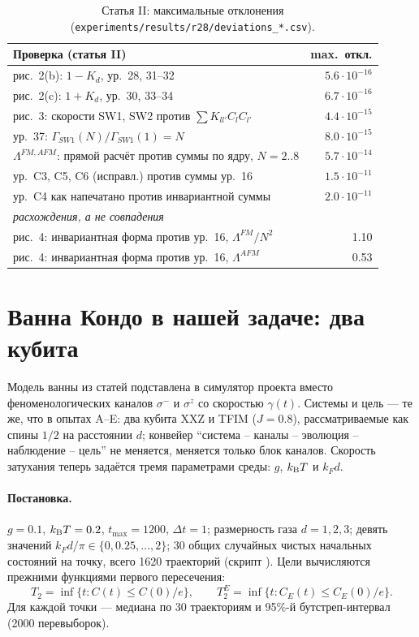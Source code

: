 \begin{table}[htbp]\centering\small
\begin{tabular}{lr}
\toprule
Проверка (статья II) & max.\ откл. \\
\midrule
рис.~2(b): $1-K_d$, ур.~28, 31--32 & $5.6\cdot 10^{-16}$ \\
рис.~2(c): $1+K_d$, ур.~30, 33--34 & $6.7\cdot 10^{-16}$ \\
рис.~3: скорости SW1, SW2 против $\sum K_{ll'}C_lC_{l'}$ & $4.4\cdot 10^{-15}$ \\
ур.~37: $\Gamma_{SW1}(N)/\Gamma_{SW1}(1)=N$ & $8.0\cdot 10^{-15}$ \\
$\Lambda^{FM,AFM}$: прямой расчёт против суммы по ядру, $N=2..8$ & $5.7\cdot 10^{-14}$ \\
ур.~C3, C5, C6 (исправл.) против суммы ур.~16 & $1.5\cdot 10^{-11}$ \\
ур.~C4 как напечатано против инвариантной суммы & $2.0\cdot 10^{-11}$ \\
\midrule
\multicolumn{2}{l}{\emph{расхождения, а не совпадения}} \\
рис.~4: инвариантная форма против ур.~16, $\Lambda^{FM}/N^2$ & 1.10 \\
рис.~4: инвариантная форма против ур.~16, $\Lambda^{AFM}$ & 0.53 \\
\bottomrule
\end{tabular}
\caption{Статья II: максимальные отклонения
(\texttt{experiments/results/r28/deviations\_*.csv}).}
\label{tab:kondo_prb}\end{table}

\section{Ванна Кондо в нашей задаче: два кубита}
\label{sec:kondo_demo}
Модель ванны из статей подставлена в симулятор проекта вместо
феноменологических каналов $\sigma^-$ и $\sigma^z$ со скоростью $\gamma(t)$. Системы
и цель --- те же, что в опытах A--E: два кубита XXZ и TFIM ($J=0.8$),
рассматриваемые как спины $1/2$ на расстоянии $d$; конвейер ``система --
каналы -- эволюция -- наблюдение -- цель'' не меняется, меняется только блок
каналов. Скорость затухания теперь задаётся тремя параметрами среды: $g$,
$k_{\mathrm B}T$ и $k_Fd$.

\paragraph{Постановка.} $g=0.1$, $k_{\mathrm B}T=0.2$, $t_{\max}=1200$, $\Delta t=1$;
размерность газа $d=1,2,3$; девять значений $k_Fd/\pi\in\{0,0.25,\dots,2\}$;
30 общих случайных чистых начальных состояний на точку, всего 1620 траекторий
(скрипт ). Цели вычисляются прежними
функциями первого пересечения:
\[
 T_2=\inf\{t:C(t)\le C(0)/e\},\qquad
 T_2^E=\inf\{t:C_E(t)\le C_E(0)/e\}.
\]
Для каждой точки --- медиана по 30 траекториям и 95\%-й бутстреп-интервал
(2000 перевыборок).

